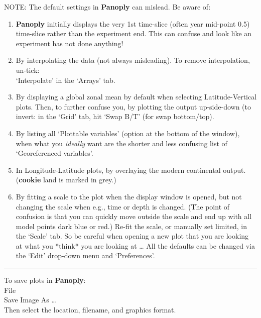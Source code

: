 \vspace{1mm}
NOTE: The default settings in \textbf{Panoply} can mislead. Be aware of:
\vspace{1mm}
\begin{enumerate}
\item \textbf{Panoply} initially displays the very 1st time-slice (often year mid-point 0.5) time-slice rather than the experiment end. This can confuse and look like an experiment has not done anything!
\item By interpolating the data (not always misleading). To remove interpolation, un-tick:
\\‘\textsf{\footnotesize Interpolate}’ in the ‘\textsf{\footnotesize Arrays}’ tab.
\item By displaying a global zonal mean by default when selecting \textsf{\footnotesize Latitude-Vertical} plots. Then, to further confuse you, by plotting the output up-side-down (to invert: in the ‘\textsf{\footnotesize Grid}’ tab, hit ‘\textsf{\footnotesize Swap B/T}’ (for swap bottom/top).
\item By listing all ‘\textsf{\footnotesize Plottable variables}’ (option at the bottom of the window), when what you \textit{ideally} want are  the shorter and less confusing list of ‘\textsf{\footnotesize Georeferenced variables}’.
\item In \textsf{\footnotesize Longitude-Latitude} plots, by overlaying the modern continental output. (\textbf{cookie} land is marked in grey.)
\item By fitting a scale to the plot when the display window is opened, but not changing the scale when e.g., time or depth is changed. (The point of confusion is that you can quickly move outside the scale and end up with all model points dark blue or red.) Re-fit the scale, or manually set limited, in the ‘\textsf{\footnotesize Scale}’ tab.
So be careful when opening a new plot that you are looking at what you *think* you are looking at …
All the defaults can be changed via the ‘\textsf{\footnotesize Edit}’ drop-down menu and ‘\textsf{\footnotesize Preferences}’.
\end{enumerate}

\vspace{1mm}\noindent\rule{4cm}{0.1mm}\vspace{2mm}

\noindent To save plots in \textbf{Panoply}:
\footnotesize
\\\textsf{File}
\\\textsf{Save Image As …}
\normalsize
\\Then select the location, filename, and graphics format.

